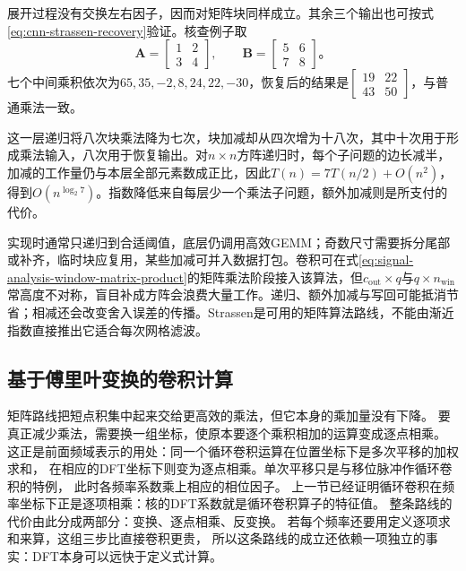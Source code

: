 展开过程没有交换左右因子，因而对矩阵块同样成立。其余三个输出也可按式\eqref{eq:cnn-strassen-recovery}验证。核查例子取
\[
  \bm A=\begin{bmatrix}1&2\\3&4\end{bmatrix},\qquad
  \bm B=\begin{bmatrix}5&6\\7&8\end{bmatrix}\text{。}
\]
七个中间乘积依次为$65,35,-2,8,24,22,-30$，恢复后的结果是$\left[\begin{smallmatrix}19&22\\43&50\end{smallmatrix}\right]$，与普通乘法一致。

这一层递归将八次块乘法降为七次，块加减却从四次增为十八次，其中十次用于形成乘法输入，八次用于恢复输出。对$n\times n$方阵递归时，每个子问题的边长减半，加减的工作量仍与本层全部元素数成正比，因此$T(n)=7T(n/2)+O(n^2)$，得到$O(n^{\log_2 7})$。指数降低来自每层少一个乘法子问题，额外加减则是所支付的代价。

实现时通常只递归到合适阈值，底层仍调用高效GEMM；奇数尺寸需要拆分尾部或补齐，临时块应复用，某些加减可并入数据打包。卷积可在式\eqref{eq:signal-analysis-window-matrix-product}的矩阵乘法阶段接入该算法，但$c_{\mathrm{out}}\times q$与$q\times n_{\mathrm{win}}$常高度不对称，盲目补成方阵会浪费大量工作。递归、额外加减与写回可能抵消节省；相减还会改变舍入误差的传播。Strassen是可用的矩阵算法路线，不能由渐近指数直接推出它适合每次网格滤波。

\subsection{基于傅里叶变换的卷积计算}\label{sec:signal-analysis-fast-fft}\label{sec:cnn-fft}

矩阵路线把短点积集中起来交给更高效的乘法，但它本身的乘加量没有下降。
要真正减少乘法，需要换一组坐标，使原本要逐个乘积相加的运算变成逐点相乘。
这正是前面频域表示的用处：同一个循环卷积运算在位置坐标下是多次平移的加权求和，
在相应的DFT坐标下则变为逐点相乘。单次平移只是与移位脉冲作循环卷积的特例，
此时各频率系数乘上相应的相位因子。
上一节已经证明循环卷积在频率坐标下正是逐项相乘：核的DFT系数就是循环卷积算子的特征值。
整条路线的代价由此分成两部分：变换、逐点相乘、反变换。
若每个频率还要用定义逐项求和来算，这组三步比直接卷积更贵，
所以这条路线的成立还依赖一项独立的事实：DFT本身可以远快于定义式计算。

